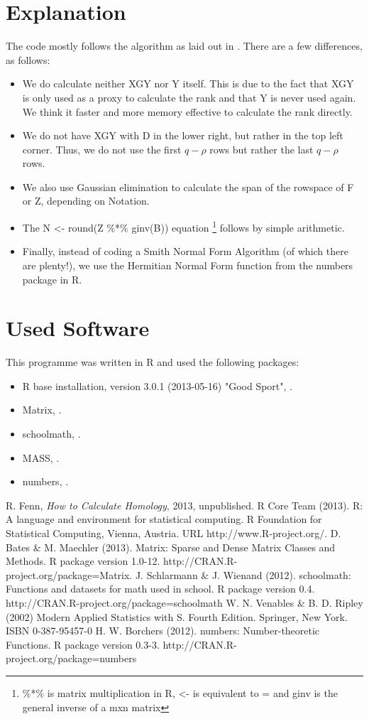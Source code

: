\documentclass[11pt]{amsart}
\begin{document}
\section{Explanation}
The code mostly follows the algorithm as laid out in \cite{Fenn1}. There are a few differences, as follows:
\begin{itemize}
	\item We do calculate neither XGY nor Y itself. This is due to the fact that XGY is only used as a proxy to calculate the rank and that Y is never used again. We think it faster and more memory effective to calculate the rank directly.
	\item We do not have XGY with D in the lower right, but rather in the top left corner. Thus, we do not use the first $q-\rho$ rows but rather the last $q-\rho$ rows.
	\item We also use Gaussian elimination to calculate the span of the rowspace of F or Z, depending on Notation.
	\item The N <- round(Z \%*\% ginv(B)) equation \footnote{\%*\% is matrix multiplication in R, <- is equivalent to = and ginv is the general inverse of a mxn matrix} follows by simple arithmetic.
	\item Finally, instead of coding a Smith Normal Form Algorithm (of which there are plenty!), we use the Hermitian Normal Form function from the numbers package in R.
\end{itemize}
\section{Used Software}
This programme was written in R and used the following packages:
\begin{itemize}
	\item R base installation, version 3.0.1 (2013-05-16) "Good Sport", \cite{Rbase}.
	\item Matrix, \cite{Matrix}.
	\item schoolmath, \cite{schoolmath}.
	\item MASS, \cite{MASS}.
	\item numbers, \cite{numbers}.
\end{itemize}
\begin{thebibliography}{0}
 R. Fenn, \emph{How to Calculate Homology}, 2013, unpublished.
 R Core Team (2013). R: A language and environment for statistical computing. R Foundation for Statistical Computing, Vienna, Austria. URL http://www.R-project.org/.
 D. Bates \& M. Maechler (2013). Matrix: Sparse and Dense Matrix Classes and Methods. R package version 1.0-12. http://CRAN.R-project.org/package=Matrix.
  J. Schlarmann \& J. Wienand (2012). schoolmath: Functions and datasets for math used in school. R package version 0.4. http://CRAN.R-project.org/package=schoolmath
 W. N. Venables \& B. D. Ripley (2002) Modern Applied Statistics with S. Fourth Edition. Springer, New York. ISBN 0-387-95457-0
 H. W. Borchers (2012). numbers: Number-theoretic Functions. R package version 0.3-3. http://CRAN.R-project.org/package=numbers
\end{thebibliography}
\end{document}
